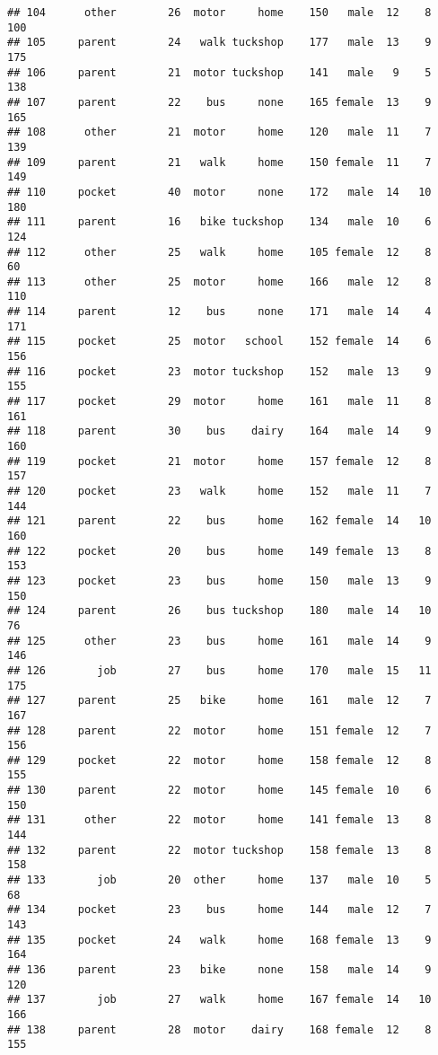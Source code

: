 \documentclass[
]{article}
\begin{document}
\begin{verbatim}
## 104      other        26  motor     home    150   male  12    8     100
## 105     parent        24   walk tuckshop    177   male  13    9     175
## 106     parent        21  motor tuckshop    141   male   9    5     138
## 107     parent        22    bus     none    165 female  13    9     165
## 108      other        21  motor     home    120   male  11    7     139
## 109     parent        21   walk     home    150 female  11    7     149
## 110     pocket        40  motor     none    172   male  14   10     180
## 111     parent        16   bike tuckshop    134   male  10    6     124
## 112      other        25   walk     home    105 female  12    8      60
## 113      other        25  motor     home    166   male  12    8     110
## 114     parent        12    bus     none    171   male  14    4     171
## 115     pocket        25  motor   school    152 female  14    6     156
## 116     pocket        23  motor tuckshop    152   male  13    9     155
## 117     pocket        29  motor     home    161   male  11    8     161
## 118     parent        30    bus    dairy    164   male  14    9     160
## 119     pocket        21  motor     home    157 female  12    8     157
## 120     pocket        23   walk     home    152   male  11    7     144
## 121     parent        22    bus     home    162 female  14   10     160
## 122     pocket        20    bus     home    149 female  13    8     153
## 123     pocket        23    bus     home    150   male  13    9     150
## 124     parent        26    bus tuckshop    180   male  14   10      76
## 125      other        23    bus     home    161   male  14    9     146
## 126        job        27    bus     home    170   male  15   11     175
## 127     parent        25   bike     home    161   male  12    7     167
## 128     parent        22  motor     home    151 female  12    7     156
## 129     pocket        22  motor     home    158 female  12    8     155
## 130     parent        22  motor     home    145 female  10    6     150
## 131      other        22  motor     home    141 female  13    8     144
## 132     parent        22  motor tuckshop    158 female  13    8     158
## 133        job        20  other     home    137   male  10    5      68
## 134     pocket        23    bus     home    144   male  12    7     143
## 135     pocket        24   walk     home    168 female  13    9     164
## 136     parent        23   bike     none    158   male  14    9     120
## 137        job        27   walk     home    167 female  14   10     166
## 138     parent        28  motor    dairy    168 female  12    8     155

\end{verbatim}
\end{document}
